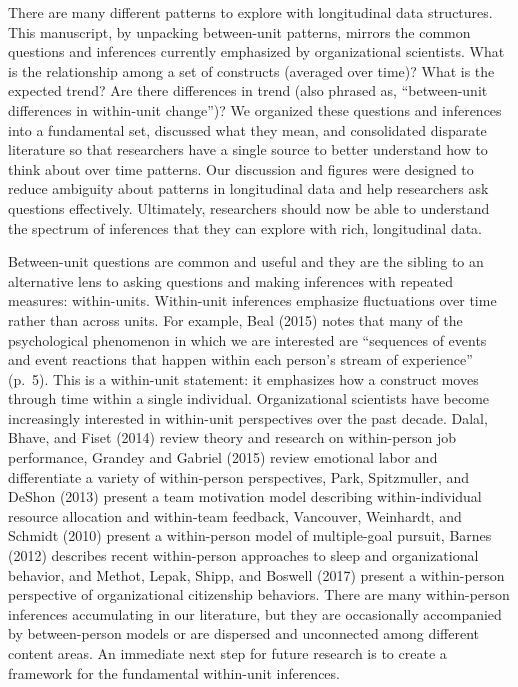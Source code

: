 \documentclass[english,,man]{apa6}
\begin{document}
There are many different patterns to explore with longitudinal data structures. This manuscript, by unpacking between-unit patterns, mirrors the common questions and inferences currently emphasized by organizational scientists. What is the relationship among a set of constructs (averaged over time)? What is the expected trend? Are there differences in trend (also phrased as, \enquote{between-unit differences in within-unit change})? We organized these questions and inferences into a fundamental set, discussed what they mean, and consolidated disparate literature so that researchers have a single source to better understand how to think about over time patterns. Our discussion and figures were designed to reduce ambiguity about patterns in longitudinal data and help researchers ask questions effectively. Ultimately, researchers should now be able to understand the spectrum of inferences that they can explore with rich, longitudinal data.

Between-unit questions are common and useful and they are the sibling to an alternative lens to asking questions and making inferences with repeated measures: within-units. Within-unit inferences emphasize fluctuations over time rather than across units. For example, Beal (2015) notes that many of the psychological phenomenon in which we are interested are \enquote{sequences of events and event reactions that happen within each person's stream of experience} (p.~5). This is a within-unit statement: it emphasizes how a construct moves through time within a single individual. Organizational scientists have become increasingly interested in within-unit perspectives over the past decade. Dalal, Bhave, and Fiset (2014) review theory and research on within-person job performance, Grandey and Gabriel (2015) review emotional labor and differentiate a variety of within-person perspectives, Park, Spitzmuller, and DeShon (2013) present a team motivation model describing within-individual resource allocation and within-team feedback, Vancouver, Weinhardt, and Schmidt (2010) present a within-person model of multiple-goal pursuit, Barnes (2012) describes recent within-person approaches to sleep and organizational behavior, and Methot, Lepak, Shipp, and Boswell (2017) present a within-person perspective of organizational citizenship behaviors. There are many within-person inferences accumulating in our literature, but they are occasionally accompanied by between-person models or are dispersed and unconnected among different content areas. An immediate next step for future research is to create a framework for the fundamental within-unit inferences.
\end{document}
